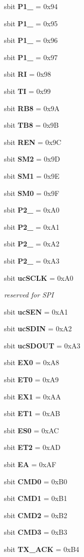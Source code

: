 \begin{DoxyCompactItemize}
\item 
sbit {\bf P1\+\_} = 0x94
\item 
sbit {\bf P1\+\_} = 0x95
\item 
sbit {\bf P1\+\_} = 0x96
\item 
sbit {\bf P1\+\_} = 0x97
\item 
sbit {\bf RI} = 0x98
\item 
sbit {\bf TI} = 0x99
\item 
sbit {\bf R\+B8} = 0x9A
\item 
sbit {\bf T\+B8} = 0x9B
\item 
sbit {\bf R\+EN} = 0x9C
\item 
sbit {\bf S\+M2} = 0x9D
\item 
sbit {\bf S\+M1} = 0x9E
\item 
sbit {\bf S\+M0} = 0x9F
\item 
sbit {\bf P2\+\_} = 0x\+A0
\item 
sbit {\bf P2\+\_} = 0x\+A1
\item 
sbit {\bf P2\+\_} = 0x\+A2
\item 
sbit {\bf P2\+\_} = 0x\+A3
\item 
sbit {\bf uc\+S\+C\+LK} = 0x\+A0
\begin{DoxyCompactList}\small\item\em reserved for S\+PI \end{DoxyCompactList}\item 
sbit {\bf uc\+S\+EN} = 0x\+A1
\item 
sbit {\bf uc\+S\+D\+IN} = 0x\+A2
\item 
sbit {\bf uc\+S\+D\+O\+UT} = 0x\+A3
\item 
sbit {\bf E\+X0} = 0x\+A8
\item 
sbit {\bf E\+T0} = 0x\+A9
\item 
sbit {\bf E\+X1} = 0x\+AA
\item 
sbit {\bf E\+T1} = 0x\+AB
\item 
sbit {\bf E\+S0} = 0x\+AC
\item 
sbit {\bf E\+T2} = 0x\+AD
\item 
sbit {\bf EA} = 0x\+AF
\item 
sbit {\bf C\+M\+D0} = 0x\+B0
\item 
sbit {\bf C\+M\+D1} = 0x\+B1
\item 
sbit {\bf C\+M\+D2} = 0x\+B2
\item 
sbit {\bf C\+M\+D3} = 0x\+B3
\item 
sbit {\bf T\+X\+\_\+\+A\+CK} = 0x\+B4
\item 

\end{DoxyCompactItemize}
